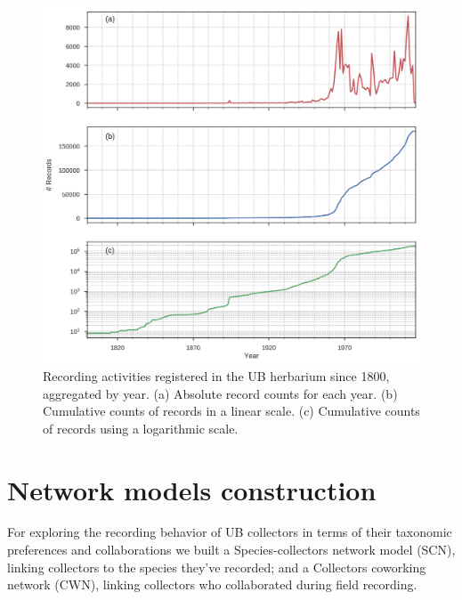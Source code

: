   \begin{figure}[h!]
  	\centering
    \includegraphics[width=\linewidth]{figures/ub_records_timeseries.png}
    \caption{Recording activities registered in the UB herbarium since 1800, aggregated by year. (a) Absolute record counts for each year. (b) Cumulative counts of records in a linear scale. (c) Cumulative counts of records using a logarithmic scale.}
    \label{fig:ub_records_timeseries}
  \end{figure}


\section{Network models construction}



For exploring the recording behavior of UB collectors in terms of their taxonomic preferences and collaborations we built a Species-collectors network model (SCN), linking collectors to the species they've recorded; and a Collectors coworking network (CWN), linking collectors who collaborated during field recording.

